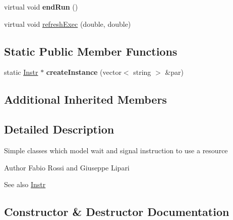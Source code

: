 \begin{DoxyCompactItemize}
\item 
virtual void {\bfseries end\+Run} ()\hypertarget{classRTSim_1_1WaitInstr_a47ce2cb069022e873f293d409d5a8519}{}\label{classRTSim_1_1WaitInstr_a47ce2cb069022e873f293d409d5a8519}

\item 
virtual void \hyperlink{classRTSim_1_1WaitInstr_a41036e9d8bfee027608b6afaa373ec3f}{refresh\+Exec} (double, double)
\end{DoxyCompactItemize}
\subsection*{Static Public Member Functions}
\begin{DoxyCompactItemize}
\item 
static \hyperlink{classRTSim_1_1Instr}{Instr} $\ast$ {\bfseries create\+Instance} (vector$<$ string $>$ \&par)\hypertarget{classRTSim_1_1WaitInstr_a0cb08c3352058f7b8f9a2e6b4215cef9}{}\label{classRTSim_1_1WaitInstr_a0cb08c3352058f7b8f9a2e6b4215cef9}

\end{DoxyCompactItemize}
\subsection*{Additional Inherited Members}


\subsection{Detailed Description}
Simple classes which model wait and signal instruction to use a resource \begin{DoxyAuthor}{Author}
Fabio Rossi and Giuseppe Lipari 
\end{DoxyAuthor}
\begin{DoxySeeAlso}{See also}
\hyperlink{classRTSim_1_1Instr}{Instr} 
\end{DoxySeeAlso}


\subsection{Constructor \& Destructor Documentation}
